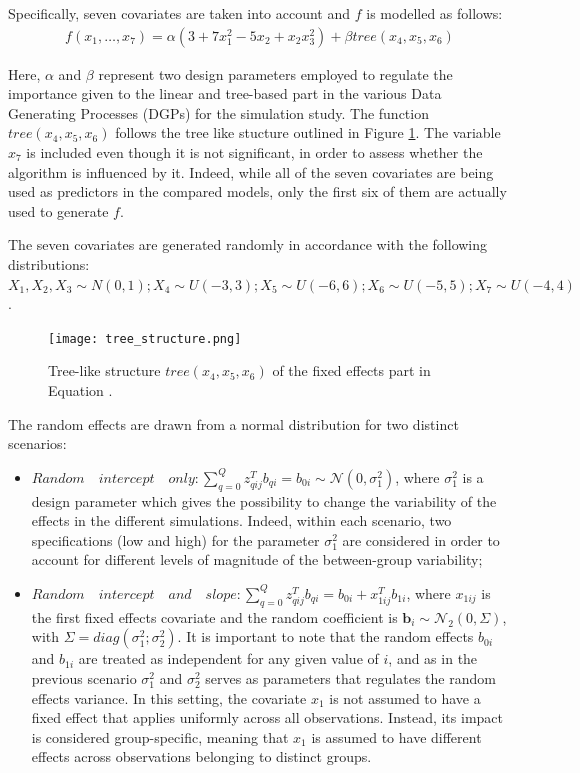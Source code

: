 Specifically, seven covariates are taken into account and \(f\) is modelled as follows:
\begin{equation}
    \label{eq:simstudy2}
    \begin{aligned}
        f(x_{1}, \dots,x_{7}) = \alpha(3+7x_{1}^2-5x_{2}+x_{2}x_{3}^2) + \beta tree(x_{4},x_{5},x_{6})
    \end{aligned}
\end{equation}

Here, \(\alpha\) and \(\beta\) represent two design parameters employed to regulate the importance given to the linear and tree-based part in the various Data Generating Processes (DGPs) for the simulation study.
The function \(tree(x_{4}, x_{5}, x_{6})\) follows the tree like stucture outlined in Figure \ref{fig:tree}.
The variable \(x_{7}\) is included even though it is not significant, in order to assess whether the algorithm is influenced by it. Indeed, while all of the seven covariates are
being used as predictors in the compared models, only the first six of them are actually used to generate \(f\).

The seven covariates are generated randomly in accordance with the following distributions:
\(X_{1},X_{2},X_{3}\sim N(0,1); X_{4}\sim U(-3,3); X_{5}\sim U(-6,6); X_{6}\sim U(-5,5); X_{7}\sim U(-4,4)\).

\begin{figure}[H]
    \centering
    \texttt{[image: tree\_structure.png]}
    \caption{Tree-like structure \(tree(x_{4},x_{5},x_{6})\) of the fixed effects part in Equation .}
    \label{fig:tree}
\end{figure}

The random effects are drawn from a normal distribution for two distinct scenarios:
\begin{itemize}
    \item \(Random \quad intercept \quad only: \sum_{q=0}^{Q} z_{qij}^T b_{qi} = b_{0i} \sim \mathcal{N}(0, \sigma^2_1)\), where \(\sigma^2_1\) is a design parameter which gives the possibility to change the variability of the effects in the different simulations.
    Indeed, within each scenario, two specifications (low and high) for the parameter \(\sigma^2_1\) are considered in order to account for different levels of magnitude of the between-group variability;
    \item \(Random \quad intercept \quad and \quad slope: \sum_{q=0}^{Q} z_{qij}^T b_{qi} = b_{0i} + x_{1ij}^T b_{1i}\), where \(x_{1ij}\) is the first fixed effects covariate and the random coefficient is \(\bm{b}_i \sim \mathcal{N}_2(0, \Sigma)\), with \(\Sigma=diag(\sigma^2_1;\sigma^2_2)\).
    It is important to note that the random effects \(b_{0i}\) and \(b_{1i}\) are treated as independent for any given value of \(i\), and as in the previous scenario \(\sigma^2_1\) and \(\sigma^2_2\) serves as parameters that regulates the random effects variance.
    In this setting, the covariate \(x_1\) is not assumed to have a fixed effect that applies uniformly across all observations. Instead, its impact is considered group-specific, meaning that \(x_1\) is assumed to have different effects across observations belonging to distinct groups.
\end{itemize}

